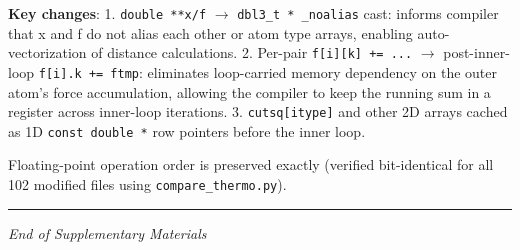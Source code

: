 \documentclass[
  11pt,
]{article}
\begin{document}
\textbf{Key changes}: 1. \texttt{double\ **x/f} \(\rightarrow\)
\texttt{dbl3\_t\ *\ \_noalias} cast: informs compiler that x and f do
not alias each other or atom type arrays, enabling auto-vectorization of
distance calculations. 2. Per-pair \texttt{f{[}i{]}{[}k{]}\ +=\ ...}
\(\rightarrow\) post-inner-loop \texttt{f{[}i{]}.k\ +=\ ftmp}:
eliminates loop-carried memory dependency on the outer atom's force
accumulation, allowing the compiler to keep the running sum in a
register across inner-loop iterations. 3. \texttt{cutsq{[}itype{]}} and
other 2D arrays cached as 1D \texttt{const\ double\ *} row pointers
before the inner loop.

Floating-point operation order is preserved exactly (verified
bit-identical for all 102 modified files using
\texttt{compare\_thermo.py}).

\begin{center}\rule{0.5\linewidth}{0.5pt}\end{center}

\emph{End of Supplementary Materials}
\end{document}

